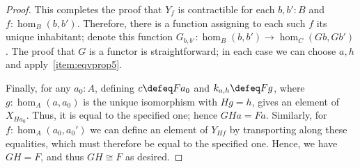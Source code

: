 \begin{proof}
  This completes the proof that $Y_f$ is contractible for each $b,b':B$ and $f:\hom_B(b,b')$.
  Therefore, there is a function assigning to each such $f$ its unique inhabitant; denote this function $G_{b,b'}:\hom_B(b,b') \to \hom_C(Gb,Gb')$.
  The proof that $G$ is a functor is straightforward; in each case we can choose $a,h$ and apply~\ref{item:eqvprop5}.

  Finally, for any $a_0:A$, defining $c\defeq Fa_0$ and $k_{a,h}\defeq F g$, where $g:\hom_A(a,a_0)$ is the unique isomorphism with $Hg = h$, gives an element of $X_{Ha_0}$.
  Thus, it is equal to the specified one; hence $GHa=Fa$.
  Similarly, for $f:\hom_A(a_0,a_0')$ we can define an element of $Y_{Hf}$ by transporting along these equalities, which must therefore be equal to the specified one.
  Hence, we have $GH=F$, and thus $GH\cong F$ as desired.
\end{proof}
